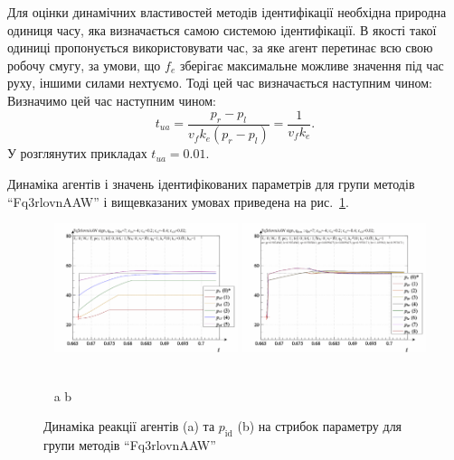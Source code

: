 Для оцінки динамічних властивостей методів ідентифікації необхідна природна
одиниця часу, яка визначається самою системою ідентифікації.
В якості такої
одиниці пропонується використовувати час, за яке агент перетинає всю свою
робочу смугу, за умови, що $f_e$ зберігає максимальне можливе значення під
час руху, іншими силами нехтуємо. Тоді цей час визначається наступним чином:
Визначимо цей час  наступним чином:
%
\begin{equation}
  t_{ua} = \frac{p_r - p_l}{ v_f k_e (p_r - p_l)} = \frac{1}{v_f k_e}.
  \label{atu:eq:t_ua}
\end{equation}
%
У розглянутих прикладах $t_{ua} = 0.01$.

Динаміка агентів і значень ідентифікованих параметрів для групи методів
``Fq3rlovnAAW'' і вищевказаних умовах приведена на рис.~\ref{atu:f:Fq3rlovnAAW_sign}.


\begin{figure}[htb!]
  \begin{center}
    ~ \hfill
    \includegraphics[width=0.48\textwidth]{p/sign/qls-p_t_pi_m_Fq3rlovnAAW_sign.png}
    \hfill
    \includegraphics[width=0.48\textwidth]{p/sign/qls-p_t_p_m_Fq3rlovnAAW_sign.png}
    \hfill ~
  \end{center}
  \vspace{-1.5ex}
  \begin{center}
    ~ \hfill a \hfill\hfill b  \hfill ~
  \end{center}
  \vspace{-2.5ex}
  \caption{Динаміка реакції агентів (a) та $p_\mathrm{id}$ (b) на стрибок параметру для групи методів ``Fq3rlovnAAW''}
  \label{atu:f:Fq3rlovnAAW_sign}
\end{figure}

